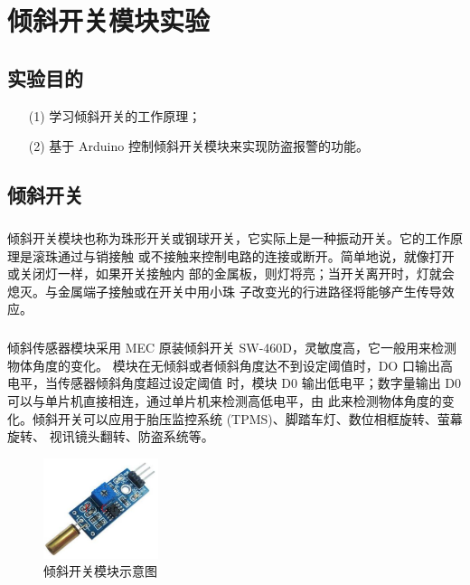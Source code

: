 \documentclass[UTF8, oneside]{ctexbook}
\begin{document}
\chapter{倾斜开关模块实验}

\section{实验目的}
\begin{itemize}
    \item[(1)] 学习倾斜开关的工作原理；
    \item[(2)] 基于 Arduino 控制倾斜开关模块来实现防盗报警的功能。
\end{itemize}

\section{倾斜开关}
\paragraph{}
倾斜开关模块也称为珠形开关或钢球开关，它实际上是一种振动开关。它的工作原理是滚珠通过与销接触
或不接触来控制电路的连接或断开。简单地说，就像打开或关闭灯一样，如果开关接触内
部的金属板，则灯将亮；当开关离开时，灯就会熄灭。与金属端子接触或在开关中用小珠
子改变光的行进路径将能够产生传导效应。

\paragraph{}
倾斜传感器模块采用 MEC 原装倾斜开关 SW-460D，灵敏度高，它一般用来检测物体角度的变化。
模块在无倾斜或者倾斜角度达不到设定阈值时，DO 口输出高电平，当传感器倾斜角度超过设定阈值
时，模块 D0 输出低电平；数字量输出 D0 可以与单片机直接相连，通过单片机来检测高低电平，由
此来检测物体角度的变化。倾斜开关可以应用于胎压监控系统 (TPMS)、脚踏车灯、数位相框旋转、萤幕旋转、
视讯镜头翻转、防盗系统等。

\begin{figure}[h]
    \centering
    \includegraphics[width=0.3\textwidth]{./result/sensor/19/sensor.png}
    \caption{倾斜开关模块示意图}
    \label{19_sensor}
\end{figure}
\end{document}
